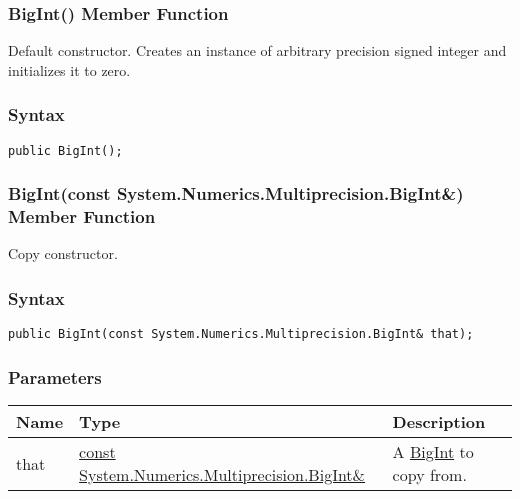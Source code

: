 \documentclass[a4paper,oneside,11.000000pt]{book}
\begin{document}
\hypertarget{System.Numerics.Multiprecision.BigInt.constructor.P.System.Numerics.Multiprecision.BigInt}{\subsubsection*{BigInt() Member Function}}
\begin{flushleft}
Default constructor. Creates an instance of arbitrary precision signed integer and initializes it to zero.

\end{flushleft}
\subsubsection*{Syntax}\texttt{public BigInt();}
\clearpage

\hypertarget{System.Numerics.Multiprecision.BigInt.constructor.P.System.Numerics.Multiprecision.BigInt.C.R.System.Numerics.Multiprecision.BigInt}{\subsubsection*{BigInt(const System.Numerics.Multiprecision.BigInt\&) Member Function}}\begin{flushleft}
Copy constructor.

\end{flushleft}
\subsubsection*{Syntax}
\texttt{public BigInt(const System.Numerics.Multiprecision.BigInt\& that);}
\subsubsection*{Parameters}
\begin{flushleft}
\begin{supertabular}[l]{!{\raggedright}p{1.30721cm}!{\raggedright}p{8.55945cm}!{\raggedright}p{4.93333cm}}
\textbf{Name}
& \textbf{Type}
& \textbf{Description}
\\
\hline
that
& \hyperlink{System.Numerics.Multiprecision.BigInt}{const System.\-Numerics.\-Multiprecision.\-BigInt\&\-}
& A \hyperlink{System.Numerics.Multiprecision.BigInt}{BigInt} to copy from.

\\
\end{supertabular}

\end{flushleft}
\clearpage
\end{document}
